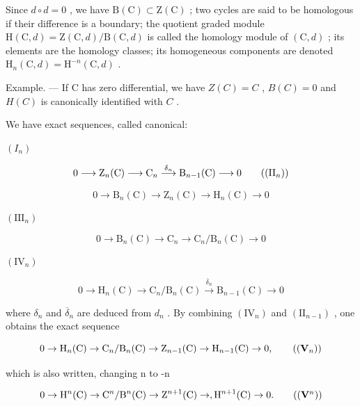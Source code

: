 Since \(d \circ d = 0\) , we have \(\mathrm{B}(\mathrm{C}) \subset \mathrm{Z}(\mathrm{C})\) ; two cycles are said to be homologous if their difference is a boundary; the quotient graded module \(\mathrm{H}(\mathrm{C}, d) = \mathrm{Z}(\mathrm{C}, d)/\mathrm{B}(\mathrm{C}, d)\) is called the homology module of \((\mathrm{C}, d)\) ; its elements are the homology classes; its homogeneous components are denoted \(\mathrm{H}_n(\mathrm{C}, d) = \mathrm{H}^{-n}(\mathrm{C}, d)\) .

Example. --- If C has zero differential, we have \(Z(C) = C\) , \(B(C) = 0\) and \(H(C)\) is canonically identified with \(C\) .

We have exact sequences, called canonical:

\((I_{n})\)

\[
0 \longrightarrow \mathrm{Z} _ {n} (\mathrm{C}) \longrightarrow \mathrm{C} _ {n} \stackrel {\delta_ {n}} {\longrightarrow} \mathrm{B} _ {n - 1} (\mathrm{C}) \longrightarrow 0\tag{\((\mathrm{II}_{n})\)}
\]

\[
0 \longrightarrow \mathrm{B} _ {n} (\mathrm{C}) \longrightarrow \mathrm{Z} _ {n} (\mathrm{C}) \longrightarrow \mathrm{H} _ {n} (\mathrm{C}) \longrightarrow 0
\]

\((\mathrm{III}_{n})\)

\[
0 \longrightarrow \mathrm{B} _ {n} (\mathrm{C}) \longrightarrow \mathrm{C} _ {n} \longrightarrow \mathrm{C} _ {n} / \mathrm{B} _ {n} (\mathrm{C}) \longrightarrow 0
\]

\((\mathrm{IV}_n)\)

\[
0 \longrightarrow \mathrm{H} _ {n} (\mathrm{C}) \longrightarrow \mathrm{C} _ {n} / \mathrm{B} _ {n} (\mathrm{C}) \stackrel {\overline {{\delta}} _ {n}} {\longrightarrow} \mathrm{B} _ {n - 1} (\mathrm{C}) \longrightarrow 0
\]

where \(\delta_{n}\) and \(\overline{\delta}_{n}\) are deduced from \(d_{n}\) . By combining \((\mathrm{IV}_{n})\) and \((\mathrm{II}_{n-1})\) , one obtains the exact sequence

\[
0 \rightarrow \mathrm{H} _ {n} (\mathrm{C}) \rightarrow \mathrm{C} _ {n} / \mathrm{B} _ {n} (\mathrm{C}) \rightarrow \mathrm{Z} _ {n - 1} (\mathrm{C}) \rightarrow \mathrm{H} _ {n - 1} (\mathrm{C}) \rightarrow 0,\tag{\((\mathbf{V}_n)\)}
\]

which is also written, changing n to -n

\[
0 \rightarrow \mathrm{H} ^ {n} (\mathrm{C}) \rightarrow \mathrm{C} ^ {n} / \mathrm{B} ^ {n} (\mathrm{C}) \rightarrow \mathrm{Z} ^ {n + 1} (\mathrm{C}) \rightarrow , \mathrm{H} ^ {n + 1} (\mathrm{C}) \rightarrow 0.\tag{\((\mathbf{V}^n)\)}
\]

